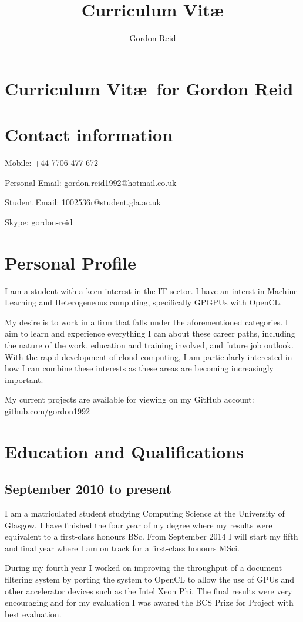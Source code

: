 \documentclass[11pt,a4paper]{article}
\title{Curriculum Vit\ae}
\author{Gordon Reid}
\begin{document}
\section*{Curriculum Vit\ae\ for Gordon Reid}
\section*{Contact information}
Mobile: +44 7706 477 672

Personal Email: gordon.reid1992@hotmail.co.uk

Student Email: 1002536r@student.gla.ac.uk

Skype: gordon-reid

\section*{Personal Profile}

I am a student with a keen interest in the IT sector. I have an interst in
Machine Learning and Heterogeneous computing, specifically GPGPUs with OpenCL.

My desire is to work in a firm that falls under the aforementioned categories. I
aim to learn and experience everything I can about these career paths, including
the nature of the work, education and training involved, and future job outlook.
With the rapid development of cloud computing, I am particularly interested in
how I can combine these interests as these areas are becoming increasingly
important.

My current projects are available for viewing on my GitHub account:
\url{github.com/gordon1992}

\section*{Education and Qualifications}

\subsection*{September 2010 to present}

I am a matriculated student studying Computing Science at the University of
Glasgow. I have finished the four year of my degree where my results were
equivalent to a first-class honours BSc. From September 2014 I will start my
fifth and final year where I am on track for a first-class honours MSci.

During my fourth year I worked on improving the throughput of a document
filtering system by porting the system to OpenCL to allow the use of GPUs and
other accelerator devices such as the Intel Xeon Phi. The final results were
very encouraging and for my evaluation I was awared the BCS Prize for Project
with best evaluation.
\end{document}

